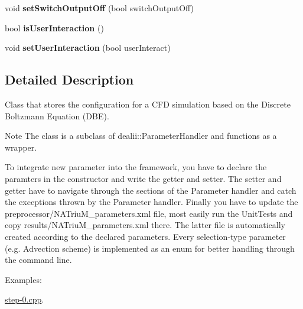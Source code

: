\begin{DoxyCompactItemize}
\item 
\hypertarget{classnatrium_1_1SolverConfiguration_afcae7f43456c2a127c242b230ea3a8a2}{void {\bfseries set\-Switch\-Output\-Off} (bool switch\-Output\-Off)}\label{classnatrium_1_1SolverConfiguration_afcae7f43456c2a127c242b230ea3a8a2}

\item 
\hypertarget{classnatrium_1_1SolverConfiguration_a6e41f8ce5da4ecafe2e4326997e79f3d}{bool {\bfseries is\-User\-Interaction} ()}\label{classnatrium_1_1SolverConfiguration_a6e41f8ce5da4ecafe2e4326997e79f3d}

\item 
\hypertarget{classnatrium_1_1SolverConfiguration_ad013b9240ee7ae0d5cc43ff5f588c3f3}{void {\bfseries set\-User\-Interaction} (bool user\-Interact)}\label{classnatrium_1_1SolverConfiguration_ad013b9240ee7ae0d5cc43ff5f588c3f3}

\end{DoxyCompactItemize}


\subsection{Detailed Description}
Class that stores the configuration for a C\-F\-D simulation based on the Discrete Boltzmann Equation (D\-B\-E). 

\begin{DoxyNote}{Note}
The class is a subclass of dealii\-::\-Parameter\-Handler and functions as a wrapper. 

To integrate new parameter into the framework, you have to declare the paramters in the constructor and write the getter and setter. The setter and getter have to navigate through the sections of the Parameter handler and catch the exceptions thrown by the Parameter handler. Finally you have to update the preprocessor/\-N\-A\-Triu\-M\-\_\-parameters.\-xml file, most easily run the Unit\-Tests and copy results/\-N\-A\-Triu\-M\-\_\-parameters.\-xml there. The latter file is automatically created according to the declared parameters. Every selection-\/type parameter (e.\-g. Advection scheme) is implemented as an enum for better handling through the command line. 
\end{DoxyNote}
\begin{Desc}
\item[Examples\-: ]\par
\hyperlink{step-0_8cpp-example}{step-\/0.\-cpp}.\end{Desc}


